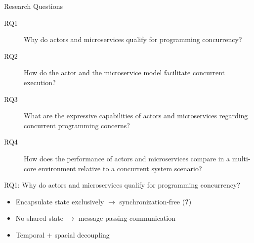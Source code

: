 \documentclass{beamer}
\begin{document}

\begin{frame}{Research Questions}


\begin{description}
  \item[RQ1] Why do actors and microservices qualify for programming concurrency?
  \item[RQ2] How do the actor and the microservice model facilitate concurrent execution?
  \item[RQ3] What are the expressive capabilities of actors and microservices regarding concurrent programming concerns?
  \item[RQ4] How does the performance of actors and microservices compare in a multi-core environment relative to a concurrent system scenario?
\end{description}

\end{frame}


\begin{frame}{RQ1: Why do actors and microservices qualify for programming concurrency?}

\begin{itemize}
  \item Encapsulate state exclusively $\rightarrow$ synchronization-free (\textbf{?})
  \item No shared state $\rightarrow$ message passing communication
  \item Temporal $+$ spacial decoupling 
\end{itemize}

\end{frame}
\end{document}
